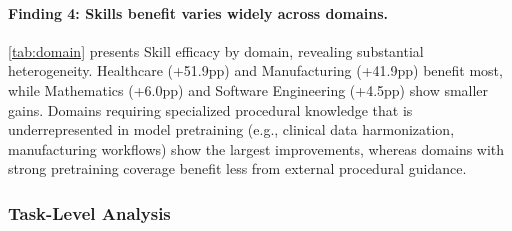 \begin{table}[h]
\vskip -0.05in
\centering
\small
\caption{Skills efficacy by domain across 84 evaluated tasks (11 domains). All domains show positive aggregate delta, though individual tasks within each domain may show negative effects.}
\label{tab:domain}
\vskip -0.05in
\end{table}

\paragraph{Finding 4: Skills benefit varies widely across domains.}
\autoref{tab:domain} presents Skill efficacy by domain, revealing substantial heterogeneity.
Healthcare (+51.9pp) and Manufacturing (+41.9pp) benefit most, while Mathematics (+6.0pp) and Software Engineering (+4.5pp) show smaller gains.
Domains requiring specialized procedural knowledge that is underrepresented in model pretraining (e.g., clinical data harmonization, manufacturing workflows) show the largest improvements, whereas domains with strong pretraining coverage benefit less from external procedural guidance.

\subsubsection{Task-Level Analysis}

